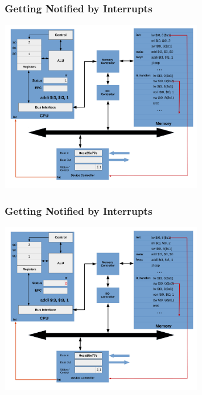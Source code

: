 \documentclass{beamer}
\begin{document}
\begin{frame}[fragile]
\frametitle{Getting Notified by Interrupts}

\begin{center}
\vspace*{-0.23cm}
\hspace*{-1cm}\includegraphics[width=8.7cm]{interrupt_waiting12.pdf}
\end{center}

\end{frame}

\begin{frame}[fragile]
\frametitle{Getting Notified by Interrupts}

\begin{center}
\vspace*{-0.23cm}
\hspace*{-1cm}\includegraphics[width=8.7cm]{interrupt_waiting13.pdf}
\end{center}

\end{frame}
\end{document}
